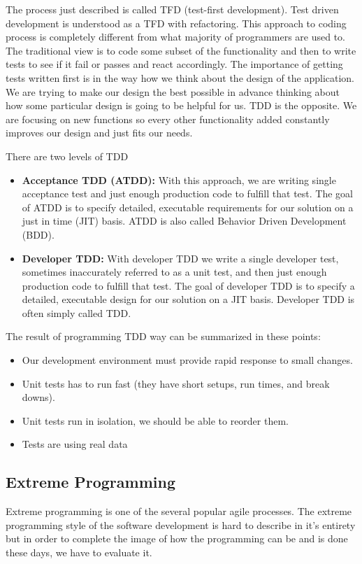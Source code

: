 \documentclass[12pt,final,oneside]{fithesis}
\begin{document}
The process just described is called TFD (test-first development). Test driven development is understood as a TFD with refactoring. This approach to coding process is completely different from what majority of programmers are used to. The traditional view is to code some subset of the functionality and then to write tests to see if it fail or passes and react accordingly. The importance of getting tests written first is in the way how we think about the design of the application. We are trying to make our design the best possible in advance thinking about how some particular design is going to be helpful for us. TDD is the opposite. We are focusing on new functions so every other functionality added constantly improves our design and just fits our needs.

There are two levels of TDD

\begin{itemize}
	\item{\textbf{Acceptance TDD (ATDD):}} With this approach, we are writing single acceptance test and just enough production code to fulfill that test. The goal of ATDD is to specify detailed, executable requirements for our solution on a just in time (JIT) basis. ATDD is also called Behavior Driven Development (BDD).
	\item{\textbf{Developer TDD:}} With developer TDD we write a single developer test, sometimes inaccurately referred to as a unit test, and then just enough production code to fulfill that test. The goal of developer TDD is to specify a detailed, executable design for our solution on a JIT basis.  Developer TDD is often simply called TDD.
\end{itemize}

The result of programming TDD way can be summarized in these points:

\begin{itemize}
	\item{Our development environment must provide rapid response to small changes.}
	\item{Unit tests has to run fast (they have short setups, run times, and break downs).}
	\item{Unit tests run in isolation, we should be able to reorder them.}
	\item{Tests are using real data}
\end{itemize}	

	\subsection{Extreme Programming}
Extreme programming is one of the several popular agile processes. The extreme programming style of the software development is hard to describe in it's entirety but in order to complete the image of how the programming can be and is done these days, we have to evaluate it.
\end{document}
